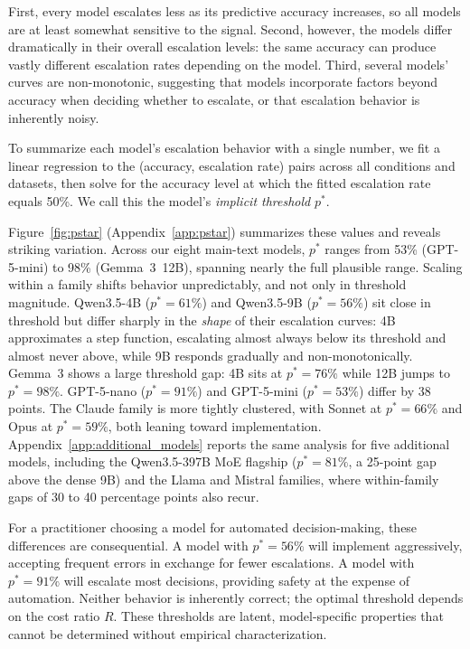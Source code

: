 \documentclass{article}
\begin{document}
First, every model escalates less as its predictive accuracy increases, so all models are at least somewhat sensitive to the signal. Second, however, the models differ dramatically in their overall escalation levels: the same accuracy can produce vastly different escalation rates depending on the model. Third, several models' curves are non-monotonic, suggesting that models incorporate factors beyond accuracy when deciding whether to escalate, or that escalation behavior is inherently noisy.

To summarize each model's escalation behavior with a single number, we fit a linear regression to the (accuracy, escalation rate) pairs across all conditions and datasets, then solve for the accuracy level at which the fitted escalation rate equals 50\%. We call this the model's \emph{implicit threshold} $p^*$.

Figure~\ref{fig:pstar} (Appendix~\ref{app:pstar}) summarizes these values and reveals striking variation. Across our eight main-text models, $p^*$ ranges from 53\% (GPT-5-mini) to 98\% (Gemma~3~12B), spanning nearly the full plausible range. Scaling within a family shifts behavior unpredictably, and not only in threshold magnitude. Qwen3.5-4B ($p^* = 61\%$) and Qwen3.5-9B ($p^* = 56\%$) sit close in threshold but differ sharply in the \emph{shape} of their escalation curves: 4B approximates a step function, escalating almost always below its threshold and almost never above, while 9B responds gradually and non-monotonically. Gemma~3 shows a large threshold gap: 4B sits at $p^* = 76\%$ while 12B jumps to $p^* = 98\%$. GPT-5-nano ($p^* = 91\%$) and GPT-5-mini ($p^* = 53\%$) differ by 38 points. The Claude family is more tightly clustered, with Sonnet at $p^* = 66\%$ and Opus at $p^* = 59\%$, both leaning toward implementation. Appendix~\ref{app:additional_models} reports the same analysis for five additional models, including the Qwen3.5-397B MoE flagship ($p^* = 81\%$, a 25-point gap above the dense 9B) and the Llama and Mistral families, where within-family gaps of 30 to 40 percentage points also recur.

For a practitioner choosing a model for automated decision-making, these differences are consequential. A model with $p^* = 56\%$ will implement aggressively, accepting frequent errors in exchange for fewer escalations. A model with $p^* = 91\%$ will escalate most decisions, providing safety at the expense of automation. Neither behavior is inherently correct; the optimal threshold depends on the cost ratio $R$. These thresholds are latent, model-specific properties that cannot be determined without empirical characterization.
\end{document}
